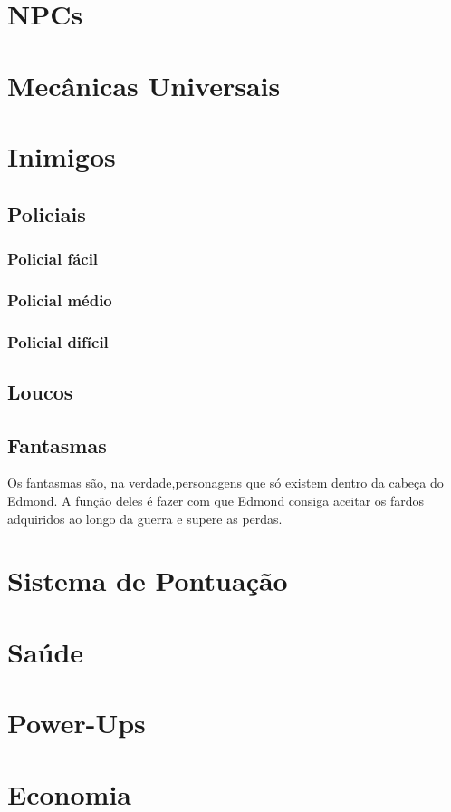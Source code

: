 \documentclass{article}
\begin{document}
\section{NPCs}
\section{Mecânicas Universais}
\section{Inimigos}
\subsection{Policiais}
\subsubsection{Policial fácil}
\subsubsection{Policial médio}
\subsubsection{Policial difícil}
\subsection{Loucos}
\subsection{Fantasmas}
Os fantasmas são, na verdade,personagens que só existem dentro da cabeça do Edmond. A função deles é fazer com que Edmond consiga aceitar os fardos adquiridos ao longo da guerra e supere as perdas.

\section{Sistema de Pontuação}
\section{Saúde}
\section{Power-Ups}
\section{Economia}
\end{document}
